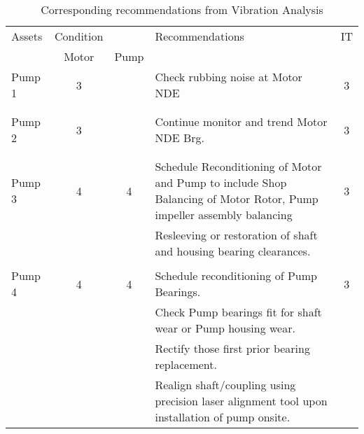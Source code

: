 \begin{table}[!h]
	\caption{Corresponding recommendations from Vibration Analysis}
	\label{ch045_tbl_vibration_recommendations}
	{\footnotesize
\begin{tabular}{l|c|c|p{8cm}|c}

\hline
Assets & \multicolumn{1}{l}{Condition} &  & Recommendations & IT \\ 
\cline{2-3}
 & Motor & Pump &  &  \\ 
\hline
Pump 1 & 3 &  & Check rubbing noise at Motor NDE & 3 \\ 
 &  &  &  &  \\ 
 &  &  &  &  \\ 
\hline
Pump 2 & 3 &  & Continue monitor and trend Motor NDE Brg. & 3 \\ 
 &  &  &  &  \\ 
 &  &  &  &  \\ 
\hline
Pump 3 & 4 & 4 & Schedule Reconditioning of Motor and Pump to include Shop Balancing of Motor Rotor, Pump impeller assembly balancing & 3 \\ 
 &  &  & Resleeving or restoration of shaft and housing bearing clearances. &  \\ 
 &  &  &  &  \\ 
\hline
Pump 4 & 4 & 4 & Schedule reconditioning of Pump Bearings. & 3 \\ 
 &  &  & Check Pump bearings fit for shaft wear or Pump housing wear. &  \\ 
 &  &  & Rectify those first prior bearing replacement. &  \\ 
 &  &  & Realign shaft/coupling using precision laser alignment tool upon installation of pump onsite. &  \\ 
\hline

\end{tabular}
	}
\end{table}